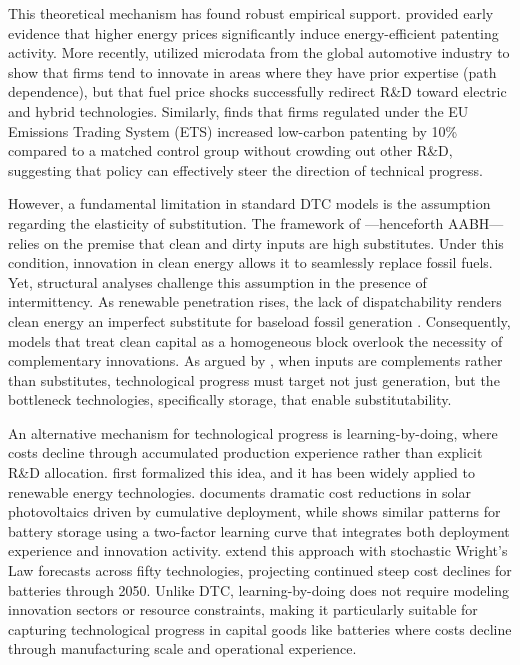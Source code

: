 	This theoretical mechanism has found robust empirical support. \citet{popp2002} provided early evidence that higher energy prices significantly induce energy-efficient patenting activity. More recently, \citet{aghion2016} utilized microdata from the global automotive industry to show that firms tend to innovate in areas where they have prior expertise (path dependence), but that fuel price shocks successfully redirect R\&D toward electric and hybrid technologies. Similarly, \citet{calel2016} finds that firms regulated under the EU Emissions Trading System (ETS) increased low-carbon patenting by 10\% compared to a matched control group without crowding out other R\&D, suggesting that policy can effectively steer the direction of technical progress.
	
	However, a fundamental limitation in standard DTC models is the assumption regarding the elasticity of substitution. The framework of \citet{acemoglu2012environment}---henceforth AABH---relies on the premise that clean and dirty inputs are high substitutes. Under this condition, innovation in clean energy allows it to seamlessly replace fossil fuels. Yet, structural analyses challenge this assumption in the presence of intermittency. As renewable penetration rises, the lack of dispatchability renders clean energy an imperfect substitute for baseload fossil generation \citep{hirth2013, joskow2011}. Consequently, models that treat clean capital as a homogeneous block overlook the necessity of complementary innovations. As argued by \citet{hart2019}, when inputs are complements rather than substitutes, technological progress must target not just generation, but the bottleneck technologies, specifically storage, that enable substitutability.
	
	An alternative mechanism for technological progress is learning-by-doing, where costs decline through accumulated production experience rather than explicit R\&D allocation. \citet{arrow1962} first formalized this idea, and it has been widely applied to renewable energy technologies. \citet{nemet2006} documents dramatic cost reductions in solar photovoltaics driven by cumulative deployment, while \citet{kittner2017} shows similar patterns for battery storage using a two-factor learning curve that integrates both deployment experience and innovation activity. \citet{way2022} extend this approach with stochastic Wright's Law forecasts across fifty technologies, projecting continued steep cost declines for batteries through 2050. Unlike DTC, learning-by-doing does not require modeling innovation sectors or resource constraints, making it particularly suitable for capturing technological progress in capital goods like batteries where costs decline through manufacturing scale and operational experience.
	
